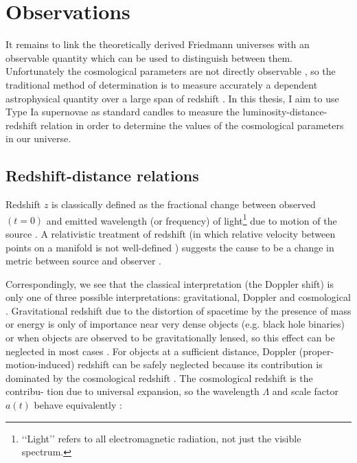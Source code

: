 \section{Observations}
\label{sec:1.4}



It remains to link the theoretically derived Friedmann universes with an observable quantity which can be used to distinguish between them. Unfortunately the cosmological parameters are not directly observable \cite{Harrison1993}, so the traditional method of determination is to measure accurately a dependent astrophysical quantity over a large span of redshift \cite{Linder1988a}. In this thesis, I aim to use Type Ia supernovae as standard candles to measure the luminosity-distance-redshift relation in order to determine the values of the cosmological parameters in our universe.

\subsection{Redshift-distance relations}
\label{subsec:redshift-distance-relations}

Redshift $z$ is classically defined as the fractional change between observed $(t = 0)$ and emitted wavelength (or frequency) of light\footnote{\lq\lq{}Light\rq\rq{} refers to all electromagnetic radiation, not just the visible spectrum.} due to motion of the source \cite{Silk1989}. A relativistic treatment of redshift (in which relative velocity between points on a manifold is not well-defined \cite{Carroll2007,doCarmo1992}) suggests the cause to be a change in metric between source and observer \cite{Carroll2007}. 

Correspondingly, we see that the classical interpretation (the Doppler shift) is only one of three possible interpretations: gravitational, Doppler and cosmological \cite{Harrison1993,Hobson2006}. Gravitational redshift due to the distortion of spacetime by the presence of mass or energy is only of importance near very dense objects (e.g. black hole binaries) or when objects are observed to be gravitationally lensed, so this effect can be neglected in most cases \cite{Harrison1993,Silk1989}. For objects at a sufficient distance, Doppler (proper-motion-induced) redshift can be safely neglected because its contribution is dominated by the cosmological redshift \cite{Silk1989}. The cosmological redshift is the contribu- tion due to universal expansion, so the wavelength $\Lambda$ and scale factor $a(t)$ behave equivalently \cite{Harrison1993}:

